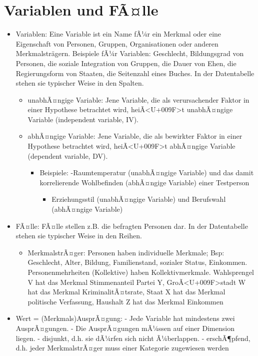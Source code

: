 \documentclass[
]{book}
\providecommand{\tightlist}{%
  \setlength{\itemsep}{0pt}\setlength{\parskip}{0pt}}
\begin{document}
\hypertarget{variablen-und-fuxe3lle}{%
\section{Variablen und FÃ¤lle}\label{variablen-und-fuxe3lle}}

\begin{itemize}
\tightlist
\item
  Variablen: Eine Variable ist ein Name fÃ¼r ein Merkmal oder eine Eigenschaft von Personen, Gruppen, Organisationen oder anderen Merkmalsträgern. Beispiele fÃ¼r Variablen: Geschlecht, Bildungsgrad von Personen, die soziale Integration von Gruppen, die Dauer von Ehen, die Regierungsform von Staaten, die Seitenzahl eines Buches. In der Datentabelle stehen sie typischer Weise in den Spalten.

  \begin{itemize}
  \item
    unabhÃ¤ngige Variable: Jene Variable, die als verursachender Faktor in einer Hypothese betrachtet wird, heiÃ\textless U+009F\textgreater t unabhÃ¤ngige Variable (independent variable, IV).
  \item
    abhÃ¤ngige Variable: Jene Variable, die als bewirkter Faktor in einer Hypothese betrachtet wird, heiÃ\textless U+009F\textgreater t abhÃ¤ngige Variable (dependent variable, DV).

    \begin{itemize}
    \tightlist
    \item
      Beispiele:
      -Raumtemperatur (unabhÃ¤ngige Variable) und das damit korrelierende Wohlbefinden (abhÃ¤ngige Variable) einer Testperson

      \begin{itemize}
      \tightlist
      \item
        Erziehungsstil (unabhÃ¤ngige Variable) und Berufswahl (abhÃ¤ngige Variable)
      \end{itemize}
    \end{itemize}
  \end{itemize}
\item
  FÃ¤lle: FÃ¤lle stellen z.B. die befragten Personen dar. In der Datentabelle stehen sie typischer Weise in den Reihen.

  \begin{itemize}
  \tightlist
  \item
    MerkmalstrÃ¤ger: Personen haben individuelle Merkmale; Bsp: Geschlecht, Alter, Bildung, Familienstand, sozialer Status, Einkommen. Personenmehrheiten (Kollektive) haben Kollektivmerkmale. Wahlsprengel V hat das Merkmal Stimmenanteil Partei Y, GroÃ\textless U+009F\textgreater stadt W hat das Merkmal KriminalitÃ¤tsrate, Staat X hat das Merkmal politische Verfassung, Haushalt Z hat das Merkmal Einkommen
  \end{itemize}
\item
  Wert = (Merkmals)AusprÃ¤gung:
  - Jede Variable hat mindestens zwei AusprÃ¤gungen.
  - Die AusprÃ¤gungen mÃ¼ssen auf einer Dimension liegen.
  - disjunkt, d.h. sie dÃ¼rfen sich nicht Ã¼berlappen.
  - erschÃ¶pfend, d.h. jeder MerkmalstrÃ¤ger muss einer Kategorie zugewiesen werden
\end{itemize}
\end{document}
